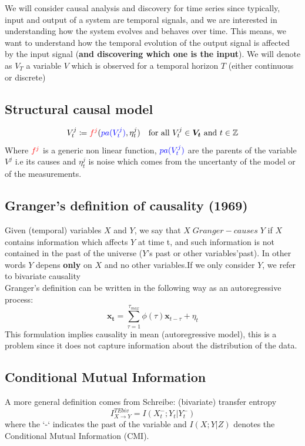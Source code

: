 We will consider causal analysis and discovery for time series since typically, 
input and output of a system are temporal signals, and we are interested in understanding 
how the system evolves and behaves over time.
This means, we want to understand how the temporal evolution of the output signal is affected
by the input signal (\textbf{and discovering which one is the input}).
We will denote as $V_T$ a variable $V$ which is observed for a temporal horizon $T$ (either continuous or
discrete)
\subsection{Structural causal model}
\begin{equation}
    V_t^j \coloneqq \textcolor{red}{f^j}(\textcolor{blue}{pa(V^j_t)}, \eta^j_t)\quad\text{for all }V_t^j\in \bm{V_t} \text{ and } t\in\mathbb{Z}
\end{equation}
Where $\textcolor{red}{f^j}$ is a generic non linear function, $\textcolor{blue}{pa(V^j_t)}$ are the parents of the variable $V^j$ i.e its causes and
$\eta^j_t$ is noise which comes from the uncertanty of the model or of the measurements.
\subsection{Granger's definition of causality (1969)}\label{sec:granger}
Given (temporal) variables $X$ and $Y$, we say that $X\;Granger-causes\;Y$
if $X$ contains information which affects $Y$ at time t, and such
information is not contained in the past of the universe ($Y$'s past or
other variables'past). In other words $Y$ depens \textbf{only} on $X$ and no other variables.If we only consider $Y$, we refer to bivariate causality \\

Granger's definition can be written in the following way as an autoregressive process:
\begin{equation}
    \bm{x_t}=\sum_{\tau=1}^{\tau_{max}}\phi(\tau)\bm{x}_{t-\tau}+\eta_t
\end{equation}
This formulation implies causality in mean (autoregressive model), this 
is a problem since it does not capture information about the distribution of the data.

\subsection{Conditional Mutual Information}
A more general definition comes from Schreibe: (bivariate) transfer entropy
\begin{equation}
    I^{TEbiv}_{X\rightarrow Y}=I(X_t^-;Y_t|Y_t^-)
    \label{eq:tebiv}
\end{equation}
where the `-` indicates the past of the variable and $I(X;Y|Z)$ denotes the Conditional Mutual Information (CMI).

